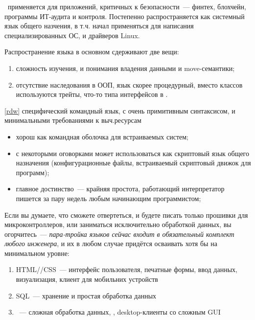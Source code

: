 \begin{description}
    \rust\ применяется для приложений, критичных к безопасности\ --- финтех,
    блохчейн, программы ИТ-аудита и контроля. Постепенно распространяется как
    системный язык общего назчения, в т.ч. начал применяться для написания
    специализированных ОС, и драйверов Linux.

    Распространение языка в основном сдерживают две вещи:
    \begin{enumerate}[nosep]
        \item сложность изучения, и понимания владения данными и move-семантики;
        \item отсутствие наследования в ООП, язык скорее процедурный, вместо
        классов используются трейты, что-то типа интерфейсов в \java.
    \end{enumerate}

\item[\F] \ref{rdw} специфический командный язык, с очень примитивным
синтаксисом, и минимальными требованиями к выч.ресурсам
    \begin{itemize}[nosep]
    \item хорош как командная оболочка для встраиваемых систем;
    \item с некоторыми оговорками может использоваться как скриптовый язык
    общего назначения (конфигурационные файлы, встраиваемый скриптовый движок
    для программ);
    \item главное достинство\ --- крайняя простота, работающий интерпретатор
    пишется за пару недель любым начинающим программистом;
    \end{itemize}

\end{description}

Если вы думаете, что сможете отвертеться, и будете писать только прошивки для
микроконтроллеров, или заниматься исключительно обработкой данных, вы
огорчитесь\ --- \textit{пара-тройка языков сейчас входит в обязательный комплект
любого инженера}, и их в любом случае придётся осваивать хотя бы на минимальном
уровне:
\begin{enumerate}%
    \item HTML/\js/CSS\ --- интерфейс пользователя, печатные формы, ввод данных,
    визуализация, клиент для мобильних устройств
    \item SQL\ --- хранение и простая обработка данных
    \item \py\ --- сложная обработка данных, ,
    desktop-клиенты со сложным GUI
\end{enumerate}
